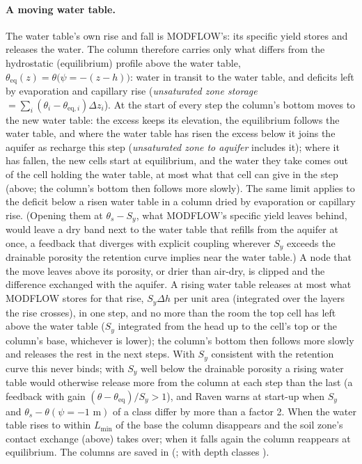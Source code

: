 \paragraph{A moving water table.} The water table's own rise and fall is MODFLOW's: its specific yield stores and
releases the water. The column therefore carries only what differs from the hydrostatic (equilibrium) profile above
the water table, $\theta_{\mathrm{eq}}(z)=\theta\big(\psi=-(z-h)\big)$: water in transit to the water table, and
deficits left by evaporation and capillary rise (\emph{unsaturated zone storage}
$=\sum_i(\theta_i-\theta_{\mathrm{eq},i})\Delta z_i$). At the start of every step the column's bottom moves to the new
water table: the excess keeps its elevation, the equilibrium follows the water table, and where the water table has
risen the excess below it joins the aquifer as recharge this step (\emph{unsaturated zone to aquifer} includes it);
where it has fallen, the new cells start at equilibrium, and the water they take comes out of the cell holding the
water table, at most what that cell can give in the step (above; the column's bottom then follows more slowly). The
same limit applies to the deficit below a risen water table in a column dried by evaporation or capillary rise. (Opening them at $\theta_s-S_y$, what MODFLOW's specific yield
leaves behind, would leave a dry band next to the water table that refills from the aquifer at once, a feedback that
diverges with explicit coupling wherever $S_y$ exceeds the drainable porosity the retention curve implies near the
water table.) A node that the move leaves above its porosity, or drier than air-dry, is clipped and the difference
exchanged with the aquifer. A rising water table releases at most what MODFLOW stores for that rise, $S_y\Delta h$ per
unit area (integrated over the layers the rise crosses), in one step, and no more than the room the top cell has left
above the water table ($S_y$ integrated from the head up to the cell's top or the column's base, whichever is lower); the column's bottom then follows more slowly and releases the rest in the next steps. With
$S_y$ consistent with the retention curve this never binds; with $S_y$ well below the drainable porosity a rising water
table would otherwise release more from the column at each step than the last (a feedback with gain $(\theta-\theta_{\mathrm{eq}})/S_y>1$),
and Raven warns at start-up when $S_y$ and $\theta_s-\theta(\psi=-1\text{ m})$ of a class differ by more than a factor 2.
When the water table rises to within $L_{\min}$ of the base the column disappears and the
soil zone's contact exchange (above) takes over; when it falls again the column reappears at equilibrium. The columns
are saved in  (; with depth classes ).

